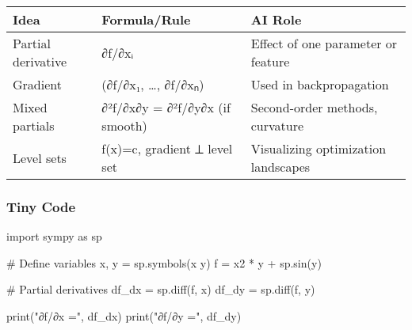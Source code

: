 \documentclass[
  letterpaper,
  DIV=11,
  numbers=noendperiod]{scrreprt}
\newenvironment{Shaded}{\begin{snugshade}}{\end{snugshade}}
\newcommand{\BuiltInTok}[1]{\textcolor[rgb]{0.00,0.23,0.31}{#1}}
\newcommand{\CommentTok}[1]{\textcolor[rgb]{0.37,0.37,0.37}{#1}}
\newcommand{\ImportTok}[1]{\textcolor[rgb]{0.00,0.46,0.62}{#1}}
\newcommand{\NormalTok}[1]{\textcolor[rgb]{0.00,0.23,0.31}{#1}}
\newcommand{\OperatorTok}[1]{\textcolor[rgb]{0.37,0.37,0.37}{#1}}
\newcommand{\StringTok}[1]{\textcolor[rgb]{0.13,0.47,0.30}{#1}}
\begin{document}
\begin{longtable}[]{@{}
  >{\raggedright\arraybackslash}p{}
  >{\raggedright\arraybackslash}p{}
  >{\raggedright\arraybackslash}p{}@{}}
\toprule\noalign{}
\begin{minipage}[b]{\linewidth}\raggedright
Idea
\end{minipage} & \begin{minipage}[b]{\linewidth}\raggedright
Formula/Rule
\end{minipage} & \begin{minipage}[b]{\linewidth}\raggedright
AI Role
\end{minipage} \\
\midrule\noalign{}
\endhead
\bottomrule\noalign{}
\endlastfoot
Partial derivative & ∂f/∂xᵢ & Effect of one parameter or feature \\
Gradient & (∂f/∂x₁, \ldots, ∂f/∂xₙ) & Used in backpropagation \\
Mixed partials & ∂²f/∂x∂y = ∂²f/∂y∂x (if smooth) & Second-order methods,
curvature \\
Level sets & f(x)=c, gradient ⟂ level set & Visualizing optimization
landscapes \\
\end{longtable}

\subsubsection{Tiny Code}\label{tiny-code-112}

\begin{Shaded}
\begin{Highlighting}[]
\ImportTok{import}\NormalTok{ sympy }\ImportTok{as}\NormalTok{ sp}

\CommentTok{\# Define variables}
\NormalTok{x, y }\OperatorTok{=}\NormalTok{ sp.symbols(}\StringTok{\textquotesingle{}x y\textquotesingle{}}\NormalTok{)}
\NormalTok{f }\OperatorTok{=}\NormalTok{ x2 }\OperatorTok{*}\NormalTok{ y }\OperatorTok{+}\NormalTok{ sp.sin(y)}

\CommentTok{\# Partial derivatives}
\NormalTok{df\_dx }\OperatorTok{=}\NormalTok{ sp.diff(f, x)}
\NormalTok{df\_dy }\OperatorTok{=}\NormalTok{ sp.diff(f, y)}

\BuiltInTok{print}\NormalTok{(}\StringTok{"∂f/∂x ="}\NormalTok{, df\_dx)}
\BuiltInTok{print}\NormalTok{(}\StringTok{"∂f/∂y ="}\NormalTok{, df\_dy)}
\end{Highlighting}
\end{Shaded}
\end{document}
